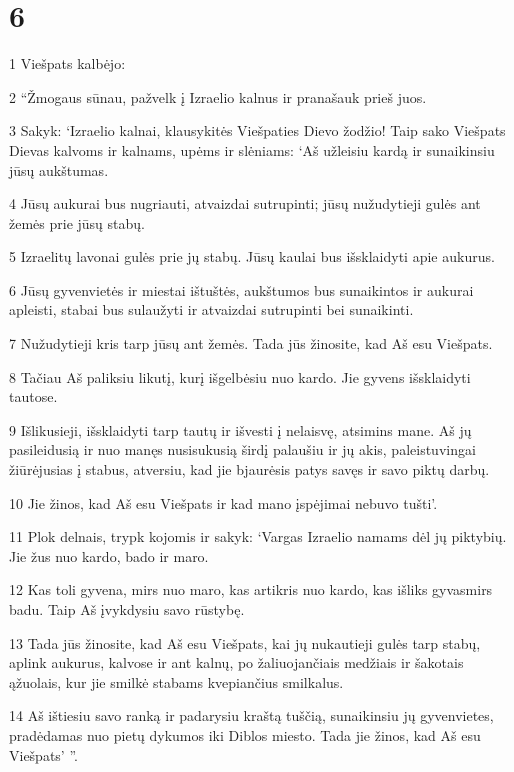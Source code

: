\chapter{6}


\par 1 Viešpats kalbėjo: 
\par 2 “Žmogaus sūnau, pažvelk į Izraelio kalnus ir pranašauk prieš juos. 
\par 3 Sakyk: ‘Izraelio kalnai, klausykitės Viešpaties Dievo žodžio! Taip sako Viešpats Dievas kalvoms ir kalnams, upėms ir slėniams: ‘Aš užleisiu kardą ir sunaikinsiu jūsų aukštumas. 
\par 4 Jūsų aukurai bus nugriauti, atvaizdai sutrupinti; jūsų nužudytieji gulės ant žemės prie jūsų stabų. 
\par 5 Izraelitų lavonai gulės prie jų stabų. Jūsų kaulai bus išsklaidyti apie aukurus. 
\par 6 Jūsų gyvenvietės ir miestai ištuštės, aukštumos bus sunaikintos ir aukurai apleisti, stabai bus sulaužyti ir atvaizdai sutrupinti bei sunaikinti. 
\par 7 Nužudytieji kris tarp jūsų ant žemės. Tada jūs žinosite, kad Aš esu Viešpats. 
\par 8 Tačiau Aš paliksiu likutį, kurį išgelbėsiu nuo kardo. Jie gyvens išsklaidyti tautose. 
\par 9 Išlikusieji, išsklaidyti tarp tautų ir išvesti į nelaisvę, atsimins mane. Aš jų pasileidusią ir nuo manęs nusisukusią širdį palaušiu ir jų akis, paleistuvingai žiūrėjusias į stabus, atversiu, kad jie bjaurėsis patys savęs ir savo piktų darbų. 
\par 10 Jie žinos, kad Aš esu Viešpats ir kad mano įspėjimai nebuvo tušti’. 
\par 11 Plok delnais, trypk kojomis ir sakyk: ‘Vargas Izraelio namams dėl jų piktybių. Jie žus nuo kardo, bado ir maro. 
\par 12 Kas toli gyvena, mirs nuo maro, kas arti­kris nuo kardo, kas išliks gyvas­mirs badu. Taip Aš įvykdysiu savo rūstybę. 
\par 13 Tada jūs žinosite, kad Aš esu Viešpats, kai jų nukautieji gulės tarp stabų, aplink aukurus, kalvose ir ant kalnų, po žaliuojančiais medžiais ir šakotais ąžuolais, kur jie smilkė stabams kvepiančius smilkalus. 
\par 14 Aš ištiesiu savo ranką ir padarysiu kraštą tuščią, sunaikinsiu jų gyvenvietes, pradėdamas nuo pietų dykumos iki Diblos miesto. Tada jie žinos, kad Aš esu Viešpats’ ”.



